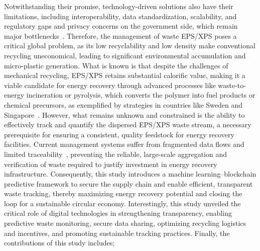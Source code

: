 \documentclass[final,5p,times,twocolumn]{elsarticle}
\begin{document}
Notwithstanding their promise, technology-driven solutions also have their limitations, including interoperability, data standardization, scalability, and regulatory gaps and privacy concerns on the government side, which remain major bottlenecks~\cite{gong2022blockchain}. Therefore, the management of waste EPS/XPS poses a critical global problem, as its low recyclability and low density make conventional recycling uneconomical, leading to significant environmental accumulation and micro-plastic generation. What is known is that despite the challenges of mechanical recycling, EPS/XPS retains substantial calorific value, making it a viable candidate for energy recovery through advanced processes like waste-to-energy incineration or pyrolysis, which converts the polymer into fuel products or chemical precursors, as exemplified by strategies in countries like Sweden and Singapore~\cite{plastic}. However, what remains unknown and constrained is the ability to effectively track and quantify the dispersed EPS/XPS waste stream, a necessary prerequisite for ensuring a consistent, quality feedstock for energy recovery facilities. Current management systems suffer from fragmented data flows and limited traceability~\cite{martinez2025, gulyamov2024}, preventing the reliable, large-scale aggregation and verification of waste required to justify investment in energy recovery infrastructure. Consequently, this study introduces a machine learning–blockchain predictive framework to secure the supply chain and enable efficient, transparent waste tracking, thereby maximizing energy recovery potential and closing the loop for a sustainable circular economy. Interestingly, this study unveiled the critical role of digital technologies in strengthening transparency, enabling predictive waste monitoring, secure data sharing, optimizing recycling logistics and incentives, and promoting sustainable tracking practices. Finally, the contributions of this study includes;
\end{document}
